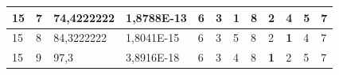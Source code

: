 \documentclass[conference]{IEEEtran}
\begin{document}
\begin{table}[]
\begin{tabular}{|llll|llllllll|}
\multicolumn{1}{|l|}{15}                                                    & \multicolumn{1}{l|}{7}                                                        & \multicolumn{1}{l|}{74,4222222}                                                   & 1,8788E-13                     & \multicolumn{1}{l|}{6}                                                  & \multicolumn{1}{l|}{3}                                                  & \multicolumn{1}{l|}{\textbf{1}}                                         & \multicolumn{1}{l|}{8}                                                  & \multicolumn{1}{l|}{2}                                                  & \multicolumn{1}{l|}{4}                                                  & \multicolumn{1}{l|}{5}                                                  & 7                          \\ \hline
\multicolumn{1}{|l|}{15}                                                    & \multicolumn{1}{l|}{8}                                                        & \multicolumn{1}{l|}{84,3222222}                                                   & 1,8041E-15                     & \multicolumn{1}{l|}{6}                                                  & \multicolumn{1}{l|}{3}                                                  & \multicolumn{1}{l|}{5}                                                  & \multicolumn{1}{l|}{8}                                                  & \multicolumn{1}{l|}{2}                                                  & \multicolumn{1}{l|}{\textbf{1}}                                         & \multicolumn{1}{l|}{4}                                                  & 7                          \\ \hline
\multicolumn{1}{|l|}{15}                                                    & \multicolumn{1}{l|}{9}                                                        & \multicolumn{1}{l|}{97,3}                                                         & 3,8916E-18                     & \multicolumn{1}{l|}{6}                                                  & \multicolumn{1}{l|}{3}                                                  & \multicolumn{1}{l|}{4}                                                  & \multicolumn{1}{l|}{8}                                                  & \multicolumn{1}{l|}{\textbf{1}}                                         & \multicolumn{1}{l|}{2}                                                  & \multicolumn{1}{l|}{5}                                                  & 7                          \\ \hline

\end{tabular}
\end{table}
\end{document}
